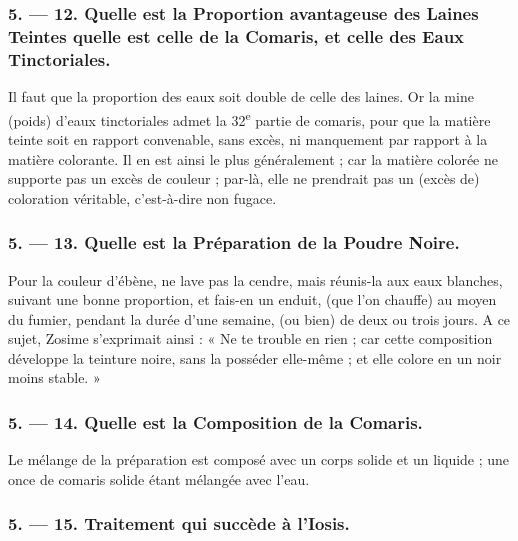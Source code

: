\documentclass[a4paper, 11pt, oneside, polutonikogreek, french]{article}
\begin{document}
\bigskip
\centerline{\EightStarTaper}
\centerline{\EightStarTaper\EightStarTaper}
\bigskip

\subsubsection{5. --- 12. Quelle est la Proportion avantageuse des Laines Teintes quelle est celle de la Comaris, et celle des Eaux Tinctoriales.}

Il faut que la proportion des eaux soit double de celle des laines. Or la mine (poids) d'eaux tinctoriales admet la 32\textsuperscript{e} partie de comaris, pour que la matière teinte soit en rapport convenable, sans excès, ni manquement par rapport à la matière colorante. Il en est ainsi le plus généralement ; car la matière colorée ne supporte pas un excès de couleur ; par-là, elle ne prendrait pas un (excès de) coloration véritable, c'est-à-dire non fugace.

\bigskip
\centerline{\EightStarTaper}
\centerline{\EightStarTaper\EightStarTaper}
\bigskip

\subsubsection{5. --- 13. Quelle est la Préparation de la Poudre Noire.}

Pour la couleur d'ébène, ne lave pas la cendre, mais réunis-la aux eaux blanches, suivant une bonne proportion, et fais-en un enduit, (que l'on chauffe) au moyen du fumier, pendant la durée d'une semaine, (ou bien) de deux ou trois jours. A ce sujet, Zosime s'exprimait ainsi : « Ne te trouble en rien ; car cette composition développe la teinture noire, sans la posséder elle-même ; et elle colore en un noir moins stable. »

\bigskip
\centerline{\EightStarTaper}
\centerline{\EightStarTaper\EightStarTaper}
\bigskip

\subsubsection{5. --- 14. Quelle est la Composition de la Comaris.}

Le mélange de la préparation est composé avec un corps solide et un liquide ; une once de comaris solide étant mélangée avec l'eau.

\bigskip
\centerline{\EightStarTaper}
\centerline{\EightStarTaper\EightStarTaper}
\bigskip

\subsubsection{5. --- 15. Traitement qui succède à l'Iosis.}
\end{document}
